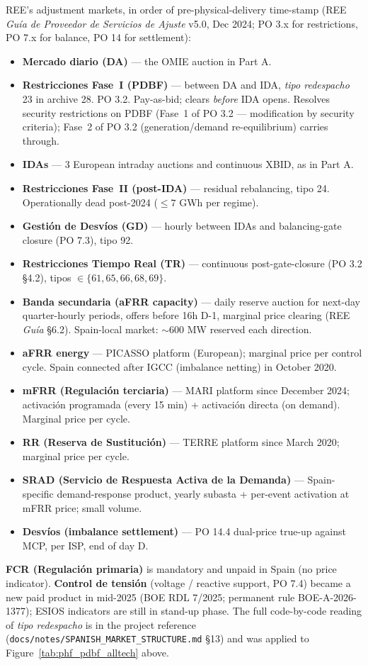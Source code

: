 \documentclass[11pt,a4paper]{article}
\begin{document}
REE's adjustment markets, in order of pre-physical-delivery time-stamp (REE \emph{Guía de Proveedor de Servicios de Ajuste} v5.0, Dec 2024; PO 3.x for restrictions, PO 7.x for balance, PO 14 for settlement):
\begin{itemize}\setlength{\itemsep}{1pt}
\item \textbf{Mercado diario (DA)} --- the OMIE auction in Part A.
\item \textbf{Restricciones Fase~I (PDBF)} --- between DA and IDA, \emph{tipo redespacho} 23 in archive 28. PO 3.2. Pay-as-bid; clears \emph{before} IDA opens. Resolves security restrictions on PDBF (Fase~1 of PO 3.2 — modification by security criteria); Fase~2 of PO 3.2 (generation/demand re-equilibrium) carries through.
\item \textbf{IDAs} --- 3 European intraday auctions and continuous XBID, as in Part A.
\item \textbf{Restricciones Fase~II (post-IDA)} --- residual rebalancing, tipo 24. Operationally dead post-2024 ($\le 7$ GWh per regime).
\item \textbf{Gestión de Desvíos (GD)} --- hourly between IDAs and balancing-gate closure (PO 7.3), tipo 92.
\item \textbf{Restricciones Tiempo Real (TR)} --- continuous post-gate-closure (PO 3.2 \S4.2), tipos $\in \{61, 65, 66, 68, 69\}$.
\item \textbf{Banda secundaria (aFRR capacity)} --- daily reserve auction for next-day quarter-hourly periods, offers before 16h D-1, marginal price clearing (REE \emph{Guía} §6.2). Spain-local market: $\sim 600$ MW reserved each direction.
\item \textbf{aFRR energy} --- PICASSO platform (European); marginal price per control cycle. Spain connected after IGCC (imbalance netting) in October 2020.
\item \textbf{mFRR (Regulación terciaria)} --- MARI platform since December 2024; activación programada (every 15 min) + activación directa (on demand). Marginal price per cycle.
\item \textbf{RR (Reserva de Sustitución)} --- TERRE platform since March 2020; marginal price per cycle.
\item \textbf{SRAD (Servicio de Respuesta Activa de la Demanda)} --- Spain-specific demand-response product, yearly subasta + per-event activation at mFRR price; small volume.
\item \textbf{Desvíos (imbalance settlement)} --- PO 14.4 dual-price true-up against MCP, per ISP, end of day D.
\end{itemize}
\textbf{FCR (Regulación primaria)} is mandatory and unpaid in Spain (no price indicator). \textbf{Control de tensión} (voltage / reactive support, PO 7.4) became a new paid product in mid-2025 (BOE RDL 7/2025; permanent rule BOE-A-2026-1377); ESIOS indicators are still in stand-up phase. The full code-by-code reading of \emph{tipo redespacho} is in the project reference (\texttt{docs/notes/SPANISH\_MARKET\_STRUCTURE.md} §13) and was applied to Figure~\ref{tab:phf_pdbf_alltech} above.
\end{document}
